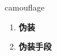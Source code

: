 
\begin{frame}
{\huge camouflage}
\begin{center}
\begin{enumerate}\Large
  \item \textbf{伪装}
  \item \textbf{伪装手段}
\end{enumerate}
\end{center}
\end{frame}
